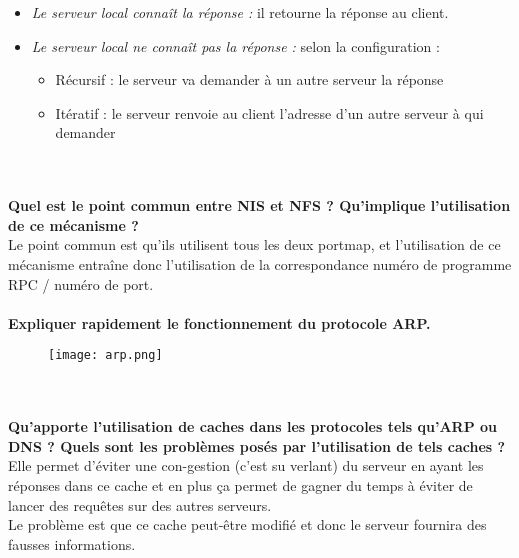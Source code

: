\documentclass[journal, a4paper]{IEEEtran}
\begin{document}
\begin{itemize}
	\item \textit{Le serveur local connaît la réponse :} il retourne la réponse au client.
	\item \textit{Le serveur local ne connaît pas la réponse :} selon la configuration :
	\begin{itemize}
		\item Récursif : le serveur va demander à un autre serveur la réponse
		\item Itératif : le serveur renvoie au client l'adresse d'un autre serveur à qui demander
	\end{itemize}
\end{itemize}
~\\
~\\
\textbf{Quel est le point commun entre NIS et NFS ? Qu'implique l'utilisation de ce mécanisme ?}\\
Le point commun est qu'ils utilisent tous les deux portmap, et l'utilisation de ce mécanisme entraîne donc l'utilisation de la correspondance numéro de programme RPC / numéro de port.
~\\
~\\
\textbf{Expliquer rapidement le fonctionnement du protocole ARP.}\\
\begin{figure}[!hbt]
	\begin{center}
	\texttt{[image: arp.png]}
	\label{fig:arp}
	\end{center}
\end{figure}
~\\
~\\
\textbf{Qu'apporte l'utilisation de caches dans les protocoles tels qu'ARP ou DNS ? Quels sont les problèmes posés par l'utilisation de tels caches ?}\\
Elle permet d'éviter une con-gestion (c'est su verlant) du serveur en ayant les réponses dans ce cache et en plus ça permet de gagner du temps à éviter de lancer des requêtes sur des autres serveurs.\\
Le problème est que ce cache peut-être modifié et donc le serveur fournira des fausses informations.
~\\
~\\

\end{document}
